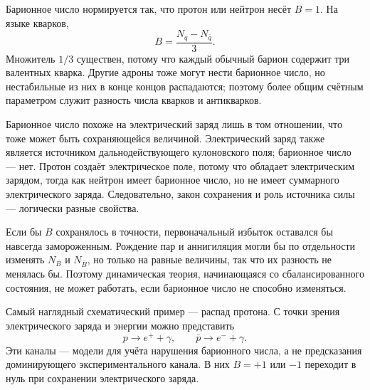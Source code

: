 Барионное число нормируется так, что протон или нейтрон несёт \(B=1\). На языке кварков,
\begin{equation}
B=\frac{N_q-N_{\bar q}}{3}.
\label{eq:c08-baryon-number}
\end{equation}
Множитель \(1/3\) существен, потому что каждый обычный барион содержит три валентных кварка. Другие адроны тоже могут нести барионное число, но нестабильные из них в конце концов распадаются; поэтому более общим счётным параметром служит разность числа кварков и антикварков.

\begin{classroomqa}
\end{classroomqa}

Барионное число похоже на электрический заряд лишь в том отношении, что тоже может быть сохраняющейся величиной. Электрический заряд также является источником дальнодействующего кулоновского поля; барионное число — нет. Протон создаёт электрическое поле, потому что обладает электрическим зарядом, тогда как нейтрон имеет барионное число, но не имеет суммарного электрического заряда. Следовательно, закон сохранения и роль источника силы — логически разные свойства.

\begin{classroomqa}
\end{classroomqa}

Если бы \(B\) сохранялось в точности, первоначальный избыток оставался бы навсегда замороженным. Рождение пар и аннигиляция могли бы по отдельности изменять \(N_B\) и \(N_{\bar B}\), но только на равные величины, так что их разность не менялась бы. Поэтому динамическая теория, начинающаяся со сбалансированного состояния, не может работать, если барионное число не способно изменяться.

Самый наглядный схематический пример — распад протона. С точки зрения электрического заряда и энергии можно представить
\begin{equation}
p\longrightarrow e^+ +\gamma,
\qquad
\bar p\longrightarrow e^-+\gamma.
\label{eq:c08-decay-pair}
\end{equation}
Эти каналы — модели для учёта нарушения барионного числа, а не предсказания доминирующего экспериментального канала. В них \(B=+1\) или \(-1\) переходит в нуль при сохранении электрического заряда.

